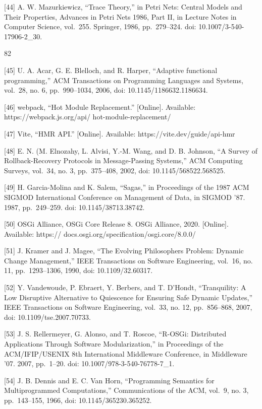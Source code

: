 \documentclass[
  10
]{article}
\begin{document}
{[}44{]} A. W. Mazurkiewicz, ``Trace Theory,'' in Petri Nets: Central
Models and Their Properties, Advances in Petri Nets 1986, Part II, in
Lecture Notes in Computer Science, vol.~255. Springer, 1986,
pp.~279--324. doi: 10.1007/3-540-17906-2\_30.

82

{[}45{]} U. A. Acar, G. E. Blelloch, and R. Harper, ``Adaptive
functional programming,'' ACM Transactions on Programming Languages and
Systems, vol.~28, no. 6, pp.~990--1034, 2006, doi:
10.1145/1186632.1186634.

{[}46{]} webpack, ``Hot Module Replacement.'' {[}Online{]}. Available:
https://webpack.js.org/api/ hot-module-replacement/

{[}47{]} Vite, ``HMR API.'' {[}Online{]}. Available:
https://vite.dev/guide/api-hmr

{[}48{]} E. N. (M. Elnozahy, L. Alvisi, Y.-M. Wang, and D. B. Johnson,
``A Survey of Rollback-Recovery Protocols in Message-Passing Systems,''
ACM Computing Surveys, vol.~34, no. 3, pp.~375--408, 2002, doi:
10.1145/568522.568525.

{[}49{]} H. Garcia-Molina and K. Salem, ``Sagas,'' in Proceedings of the
1987 ACM SIGMOD International Conference on Management of Data, in
SIGMOD '87. 1987, pp.~249--259. doi: 10.1145/38713.38742.

{[}50{]} OSGi Alliance, OSGi Core Release 8. OSGi Alliance, 2020.
{[}Online{]}. Available: https://
docs.osgi.org/specification/osgi.core/8.0.0/

{[}51{]} J. Kramer and J. Magee, ``The Evolving Philosophers Problem:
Dynamic Change Management,'' IEEE Transactions on Software Engineering,
vol.~16, no. 11, pp.~1293--1306, 1990, doi: 10.1109/32.60317.

{[}52{]} Y. Vandewoude, P. Ebraert, Y. Berbers, and T. D'Hondt,
``Tranquility: A Low Disruptive Alternative to Quiescence for Ensuring
Safe Dynamic Updates,'' IEEE Transactions on Software Engineering,
vol.~33, no. 12, pp.~856--868, 2007, doi: 10.1109/tse.2007.70733.

{[}53{]} J. S. Rellermeyer, G. Alonso, and T. Roscoe, ``R-OSGi:
Distributed Applications Through Software Modularization,'' in
Proceedings of the ACM/IFIP/USENIX 8th International Middleware
Conference, in Middleware '07. 2007, pp.~1--20. doi:
10.1007/978-3-540-76778-7\_1.

{[}54{]} J. B. Dennis and E. C. Van Horn, ``Programming Semantics for
Multiprogrammed Computations,'' Communications of the ACM, vol.~9, no.
3, pp.~143--155, 1966, doi: 10.1145/365230.365252.
\end{document}

